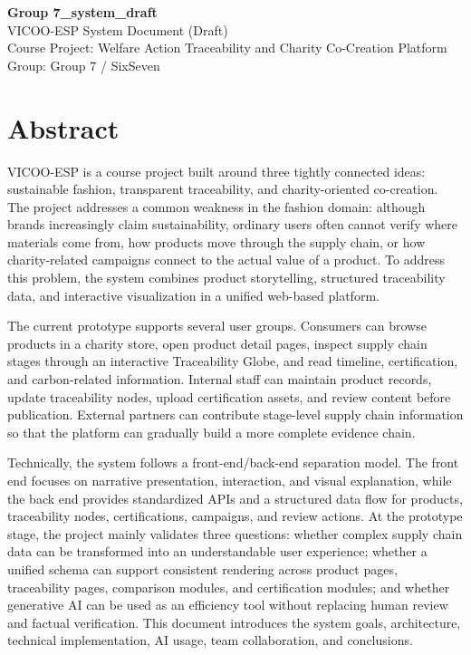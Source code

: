 \documentclass[11pt]{article}
\newcommand{\projectname}{VICOO-ESP}
\begin{document}
\begin{center}
{\LARGE \textbf{Group 7\_system\_draft}}\\[0.5em]
{\large \projectname{} System Document (Draft)}\\[0.5em]
Course Project: Welfare Action Traceability and Charity Co-Creation Platform\\
Group: Group 7 / SixSeven\\
\end{center}

\section*{Abstract}
\projectname{} is a course project built around three tightly connected ideas: sustainable fashion, transparent traceability, and charity-oriented co-creation. The project addresses a common weakness in the fashion domain: although brands increasingly claim sustainability, ordinary users often cannot verify where materials come from, how products move through the supply chain, or how charity-related campaigns connect to the actual value of a product. To address this problem, the system combines product storytelling, structured traceability data, and interactive visualization in a unified web-based platform.

The current prototype supports several user groups. Consumers can browse products in a charity store, open product detail pages, inspect supply chain stages through an interactive Traceability Globe, and read timeline, certification, and carbon-related information. Internal staff can maintain product records, update traceability nodes, upload certification assets, and review content before publication. External partners can contribute stage-level supply chain information so that the platform can gradually build a more complete evidence chain.

Technically, the system follows a front-end/back-end separation model. The front end focuses on narrative presentation, interaction, and visual explanation, while the back end provides standardized APIs and a structured data flow for products, traceability nodes, certifications, campaigns, and review actions. At the prototype stage, the project mainly validates three questions: whether complex supply chain data can be transformed into an understandable user experience; whether a unified schema can support consistent rendering across product pages, traceability pages, comparison modules, and certification modules; and whether generative AI can be used as an efficiency tool without replacing human review and factual verification. This document introduces the system goals, architecture, technical implementation, AI usage, team collaboration, and conclusions.
\end{document}
